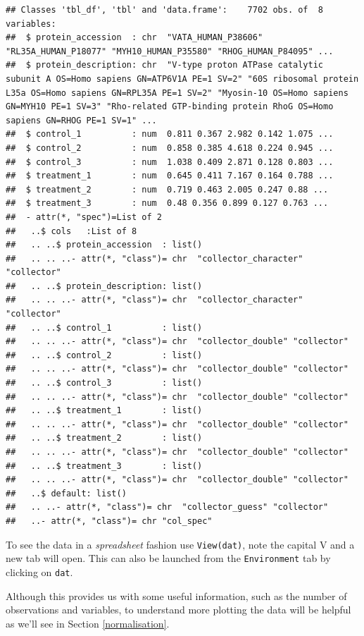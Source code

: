 \documentclass[12pt,]{book}
\theoremstyle{definition}
\theoremstyle{definition}
\theoremstyle{definition}
\theoremstyle{remark}
\begin{document}
\begin{verbatim}
## Classes 'tbl_df', 'tbl' and 'data.frame':    7702 obs. of  8 variables:
##  $ protein_accession  : chr  "VATA_HUMAN_P38606" "RL35A_HUMAN_P18077" "MYH10_HUMAN_P35580" "RHOG_HUMAN_P84095" ...
##  $ protein_description: chr  "V-type proton ATPase catalytic subunit A OS=Homo sapiens GN=ATP6V1A PE=1 SV=2" "60S ribosomal protein L35a OS=Homo sapiens GN=RPL35A PE=1 SV=2" "Myosin-10 OS=Homo sapiens GN=MYH10 PE=1 SV=3" "Rho-related GTP-binding protein RhoG OS=Homo sapiens GN=RHOG PE=1 SV=1" ...
##  $ control_1          : num  0.811 0.367 2.982 0.142 1.075 ...
##  $ control_2          : num  0.858 0.385 4.618 0.224 0.945 ...
##  $ control_3          : num  1.038 0.409 2.871 0.128 0.803 ...
##  $ treatment_1        : num  0.645 0.411 7.167 0.164 0.788 ...
##  $ treatment_2        : num  0.719 0.463 2.005 0.247 0.88 ...
##  $ treatment_3        : num  0.48 0.356 0.899 0.127 0.763 ...
##  - attr(*, "spec")=List of 2
##   ..$ cols   :List of 8
##   .. ..$ protein_accession  : list()
##   .. .. ..- attr(*, "class")= chr  "collector_character" "collector"
##   .. ..$ protein_description: list()
##   .. .. ..- attr(*, "class")= chr  "collector_character" "collector"
##   .. ..$ control_1          : list()
##   .. .. ..- attr(*, "class")= chr  "collector_double" "collector"
##   .. ..$ control_2          : list()
##   .. .. ..- attr(*, "class")= chr  "collector_double" "collector"
##   .. ..$ control_3          : list()
##   .. .. ..- attr(*, "class")= chr  "collector_double" "collector"
##   .. ..$ treatment_1        : list()
##   .. .. ..- attr(*, "class")= chr  "collector_double" "collector"
##   .. ..$ treatment_2        : list()
##   .. .. ..- attr(*, "class")= chr  "collector_double" "collector"
##   .. ..$ treatment_3        : list()
##   .. .. ..- attr(*, "class")= chr  "collector_double" "collector"
##   ..$ default: list()
##   .. ..- attr(*, "class")= chr  "collector_guess" "collector"
##   ..- attr(*, "class")= chr "col_spec"
\end{verbatim}

To see the data in a \emph{spreadsheet} fashion use \texttt{View(dat)},
note the capital V and a new tab will open. This can also be launched
from the \texttt{Environment} tab by clicking on \texttt{dat}.

Although this provides us with some useful information, such as the
number of observations and variables, to understand more plotting the
data will be helpful as we'll see in Section \ref{normalisation}.
\end{document}
